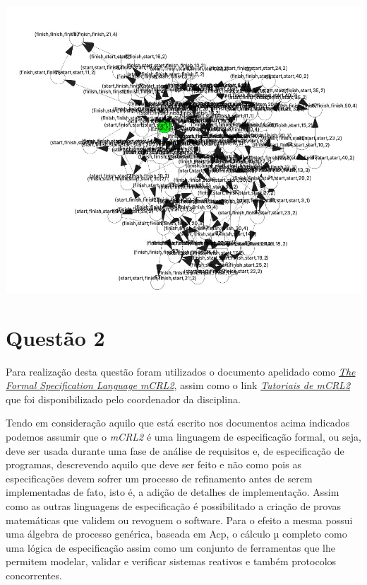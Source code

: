 \documentclass[11pt,a4paper]{report}
\begin{document}
\begin{minipage}{0.9\linewidth}
        \centering
		\includegraphics[width=\textwidth]{Ex11.jpeg}\par\vspace{1cm}
\end{minipage}

\newpage

\section{Questão 2}

Para realização desta questão foram utilizados o  documento apelidado como \emph{\href{https://www.researchgate.net/publication/30815544_The_Formal_Specification_Language_mCRL2}{The Formal Specification Language mCRL2}}, assim como o link \emph{\href{www.mcrl2.org/web/user_manual/tutorial/tutorial.html}{Tutoriais de mCRL2}} que foi disponibilizado pelo coordenador da disciplina.

Tendo em consideração aquilo que está escrito nos documentos acima indicados podemos assumir que o \emph{mCRL2} é uma linguagem de especificação formal, ou seja, deve ser usada durante uma fase de análise de requisitos e, de especificação de programas, descrevendo aquilo que deve ser feito e não como pois as especificações devem sofrer um processo de refinamento antes de serem implementadas de fato, isto é, a adição de detalhes de implementação. Assim como as outras linguagens de especificação é possibilitado a criação de provas matemáticas que validem ou revoguem o software. Para o efeito a mesma possui uma álgebra de processo genérica, baseada em Acp, o cálculo µ completo como uma lógica de especificação assim como um conjunto de ferramentas que lhe permitem  modelar, validar e verificar sistemas reativos e também protocolos concorrentes.
\end{document}
